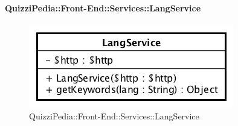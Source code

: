 \paragraph{QuizziPedia::Front-End::Services::LangService}
\begin{figure}[ht]
	\centering
	\includegraphics[scale=0.60]{UML/Classi/Front-End/QuizziPedia_Front-end_Services_LangService.png}
	\caption{QuizziPedia::Front-End::Services::LangService}
\end{figure}\FloatBarrier
